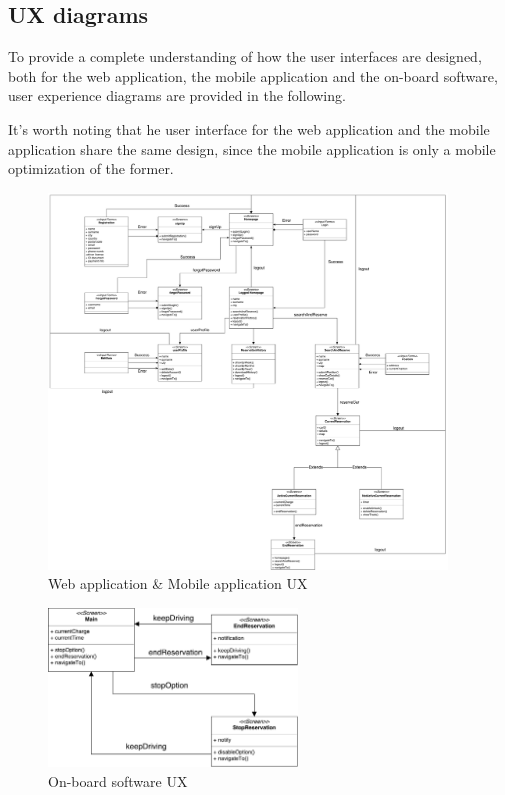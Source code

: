 \subsection{UX diagrams}

To provide a complete understanding of how the user interfaces are designed, both for the web application, the mobile application and the on-board software, user experience diagrams are provided in the following.

It's worth noting that he user interface for the web application and the mobile application share the same design, since the mobile application is only a mobile optimization of the former.

\begin{figure}[h!]
	\centerline{
		\includegraphics[width=400px]{../Datas/images/deviceUX.pdf}
	}
	\caption{Web application \& Mobile application UX}
	\label{fig: device-ux}
\end{figure}

\begin{figure}[h!]
	\centerline{
		\includegraphics[width=250px]{../Datas/images/carDisplayUX.pdf}
	}
	\caption{On-board software UX}
	\label{fig: car-ux}
\end{figure}
